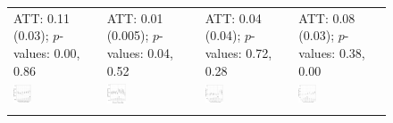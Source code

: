 \documentclass[12pt]{article}
\begin{document}
\begin{figure}[!th]
\begin{minipage}{1\linewidth}
{{\begin{tabular}{C{3.8cm}C{3.8cm}C{3.8cm}C{3.8cm}}
   \citet{Bokobza2022} \newline ATT: 0.11 (0.03); \newline $p$-values: 0.00, 0.86 &
   \citet{Caughey2017} \newline ATT: 0.01 (0.005); \newline $p$-values: 0.04, 0.52 &  
   \citet{Christensen2021}  \newline ATT: 0.04 (0.04); \newline $p$-values: 0.72, 0.28 & 
   \citet{Clarke2020}  \newline ATT: 0.08 (0.03); \newline $p$-values: 0.38, 0.00 \\
   \hspace{-2em}  \includegraphics[width = 0.22\textwidth]{fect/bokobza_fect_entry} &
   \hspace{-2em} \includegraphics[width = 0.22\textwidth]{fect/Caughey_fect_entry}  &
   \hspace{-2em} \includegraphics[width = 0.22\textwidth]{fect/chris_sub_fect_entry}  & 
   \hspace{-2em}  \includegraphics[width = 0.22\textwidth]{fect/Clark_fect_entry} \\ \\ 

\end{tabular}}}
\end{minipage}
\end{figure}
\end{document}

